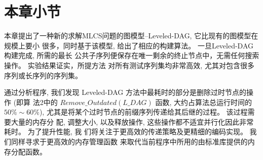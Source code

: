 \section{本章小节
}
\label{sec:conculsion}

本章提出了一种新的求解MLCS问题的图模型--Leveled-DAG, 它比现有的图模型在规模上要小
很多，同时基于该模型, 给出了相应的构建算法。 一旦Leveled-DAG构建完成, 所需的最长
公共子序列便保存在唯一剩余的终止节点中，无需任何搜索操作。 实验结果证实，所提方法
对所有测试序列集均非常高效, 尤其对包含很多序列或长序列的序列集。

通过分析程序, 我们发现 Leveled-DAG 方法中最耗时的部分是删除过时节点的操作 (即算
法2中的 $Remove\_Outdated(L\_DAG)$ 函数, 大约占算法总运行时间的 $50\% \sim
60\%$), 尤其是将某个过时节点的前缀序列传递给其后继的过程。 该过程需要大量的内存分
配, 调整大小, 以及释放操作, 这些操作都不适宜并行化因此非常耗时。 为了提升性能, 我
们将关注于更高效的传递策略及更精细的编码实现。 我们同样寻求于更高效的内存管理函数
来取代当前程序中所用的由标准库提供的内存分配函数。



